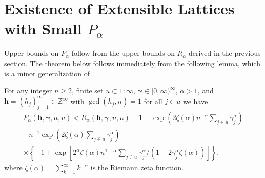 \documentclass{article}
\renewcommand{\vec}[1]{\ensuremath{\mathbf{#1}}}
\newcommand{\vecsym}[1]{\ensuremath{\boldsymbol{#1}}}
\newcommand{\bfgam}{\vecsym \gamma}
\newcommand{\h}{\vec h}
\newcommand{\Z}{\mathbb{Z}}
\begin{document}
\section{Existence of Extensible Lattices with Small $P_{\alpha}$}


Upper bounds on $P_{\alpha}$ follow from the upper bounds on
$R_{\alpha}$ derived in the previous section.  The theorem below
follows immediately from the following lemma, which is a minor
generalization of \cite[Theorem 5.5]{Nie92}.

\begin{lemma} \label{RPlem} For any integer $n \ge 2$, finite set $u
\subset 1:\infty$, $\bfgam \in [0,\infty)^{\infty}$, $\alpha > 1$, and $\h 
=(h_j)_{j=1}^{\infty} \in
\Z^{\infty}$ with $\gcd(h_{j},n)=1$ for all $j \in u$ we have
\begin{multline*}
    P_{\alpha}(\h,\bfgam,n,u) < R_{\alpha}(\h,\bfgam,n,u) -1 + \exp\left( 2 
    \zeta(\alpha)n^{-\alpha}  \sum_{j \in u} \gamma^{\alpha}_{j} 
    \right)  \\
    + n^{-1} \exp\left( 2 \zeta(\alpha) \sum_{j \in u}
    \gamma^{\alpha}_{j} \right) \\
    \times \left\{-1 + \exp\left[ 2^{\alpha}
    \zeta(\alpha)n^{1-\alpha} \sum_{j \in u} \gamma^{\alpha}_{j}/(1 +
    2 \gamma_{j}^{\alpha} \zeta(\alpha)) \right] \right\},
\end{multline*}
where $\zeta(\alpha) = \sum_{k=1}^{\infty} k^{-\alpha}$ is the 
Riemann zeta function.
\end{lemma}
\end{document}
